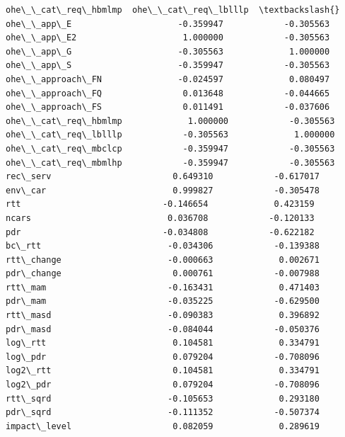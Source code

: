 \documentclass[11pt]{article}
\begin{document}
\begin{tcolorbox}[breakable, size=fbox, boxrule=.5pt, pad at break*=1mm, opacityfill=0]
\begin{Verbatim}[commandchars=\\\{\}]
                     ohe\_\_cat\_req\_hbmlmp  ohe\_\_cat\_req\_lblllp  \textbackslash{}
ohe\_\_app\_E                     -0.359947            -0.305563
ohe\_\_app\_E2                     1.000000            -0.305563
ohe\_\_app\_G                     -0.305563             1.000000
ohe\_\_app\_S                     -0.359947            -0.305563
ohe\_\_approach\_FN               -0.024597             0.080497
ohe\_\_approach\_FQ                0.013648            -0.044665
ohe\_\_approach\_FS                0.011491            -0.037606
ohe\_\_cat\_req\_hbmlmp             1.000000            -0.305563
ohe\_\_cat\_req\_lblllp            -0.305563             1.000000
ohe\_\_cat\_req\_mbclcp            -0.359947            -0.305563
ohe\_\_cat\_req\_mbmlhp            -0.359947            -0.305563
rec\_serv                        0.649310            -0.617017
env\_car                         0.999827            -0.305478
rtt                            -0.146654             0.423159
ncars                           0.036708            -0.120133
pdr                            -0.034808            -0.622182
bc\_rtt                         -0.034306            -0.139388
rtt\_change                     -0.000663             0.002671
pdr\_change                      0.000761            -0.007988
rtt\_mam                        -0.163431             0.471403
pdr\_mam                        -0.035225            -0.629500
rtt\_masd                       -0.090383             0.396892
pdr\_masd                       -0.084044            -0.050376
log\_rtt                         0.104581             0.334791
log\_pdr                         0.079204            -0.708096
log2\_rtt                        0.104581             0.334791
log2\_pdr                        0.079204            -0.708096
rtt\_sqrd                       -0.105653             0.293180
pdr\_sqrd                       -0.111352            -0.507374
impact\_level                    0.082059             0.289619


\end{Verbatim}
\end{tcolorbox}
\end{document}
